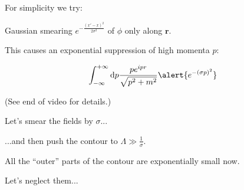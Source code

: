 \documentclass[aspectratio=169]{beamer}
\newcommand{\integrand}{\frac{p e^{ipr}}{\sqrt{p^2 + m^2}}}
\newcommand{\vr}{\mathbf{r}}
\newcommand{\diffop}{\mathop{}\!\mathrm{d}}
\newcommand{\dip}{\diffop p}
\newcommand{\intii}{\int_{-\infty}^{+\infty}}
\begin{document}
\begin{frame}
For simplicity we try:

\pause
\alert{Gaussian} smearing $e^{-\frac{(x' - x)^2}{2\sigma^2}}$ of $\phi$ only along $\vr$.

\medskip
\pause
This causes an \alert{exponential suppression of high momenta} $p$:

\pause
\begin{equation*}
\intii \dip \integrand \alert{e^{-(\sigma p)^2}}
\end{equation*}

\pause
\medskip
(See end of video for details.)
\end{frame}




\begin{frame}
Let's smear the fields by $\sigma$...

\medskip
\pause
...and then push the contour to $\Lambda \gg \frac{1}{\sigma}$.
\end{frame}




\begin{frame}
All the ``outer'' parts of the contour are exponentially small now.

\medskip
\pause
Let's neglect them...
\end{frame}


\end{document}
